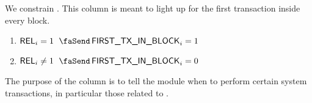 We constrain \txFirstTransactionInBlock{}.
This column is meant to light up for the first transaction inside every block.
\begin{enumerate}
	\item $\textsf{REL} _{i} =    1$ \Then $\txFirstTransactionInBlock _{i} = 1$
	\item $\textsf{REL} _{i} \neq 1$ \Then $\txFirstTransactionInBlock _{i} = 0$
\end{enumerate}
\saNote{}
The purpose of the \txFirstTransactionInBlock{} column is to tell the \hubMod{} module
when to perform certain system transactions, in particular those related to
\cite{EIP-4788}.
